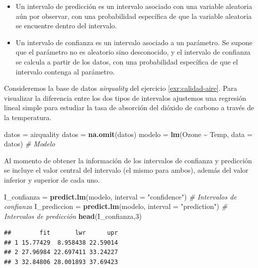 \documentclass[
  11pt,
]{book}
\newenvironment{Shaded}{\begin{snugshade}}{\end{snugshade}}
\newcommand{\AttributeTok}[1]{\textcolor[rgb]{0.13,0.29,0.53}{#1}}
\newcommand{\CommentTok}[1]{\textcolor[rgb]{0.56,0.35,0.01}{\textit{#1}}}
\newcommand{\DecValTok}[1]{\textcolor[rgb]{0.00,0.00,0.81}{#1}}
\newcommand{\FunctionTok}[1]{\textcolor[rgb]{0.13,0.29,0.53}{\textbf{#1}}}
\newcommand{\NormalTok}[1]{#1}
\newcommand{\OtherTok}[1]{\textcolor[rgb]{0.56,0.35,0.01}{#1}}
\newcommand{\SpecialCharTok}[1]{\textcolor[rgb]{0.81,0.36,0.00}{\textbf{#1}}}
\newcommand{\StringTok}[1]{\textcolor[rgb]{0.31,0.60,0.02}{#1}}
\theoremstyle{definition}
\theoremstyle{definition}
\theoremstyle{definition}
\theoremstyle{definition}
\theoremstyle{remark}
\begin{document}
\begin{itemize}
\item
  Un intervalo de predicción es un intervalo asociado con una variable aleatoria aún por observar, con una probabilidad específica de que la variable aleatoria se encuentre dentro del intervalo.
\item
  Un intervalo de confianza es un intervalo asociado a un parámetro. Se supone que el parámetro no es aleatorio sino desconocido, y el intervalo de confianza se calcula a partir de los datos, con una probabilidad específica de que el intervalo contenga al parámetro.
\end{itemize}

Consideremos la base de datos \emph{airquality} del ejercicio \ref{exr:calidad-aire}. Para visualizar la diferencia entre los dos tipos de intervalos ajustemos una regresión lineal simple para estudiar la tasa de absorción del dióxido de carbono a través de la temperatura.

\begin{Shaded}
\begin{Highlighting}[]
\NormalTok{datos }\OtherTok{=}\NormalTok{ airquality}
\NormalTok{datos }\OtherTok{=} \FunctionTok{na.omit}\NormalTok{(datos)}
\NormalTok{modelo }\OtherTok{=} \FunctionTok{lm}\NormalTok{(Ozone }\SpecialCharTok{\textasciitilde{}}\NormalTok{ Temp, }\AttributeTok{data =}\NormalTok{ datos) }\CommentTok{\# Modelo}
\end{Highlighting}
\end{Shaded}

Al momento de obtener la información de los intervalos de confianza y predicción se incluye el valor central del intervalo (el mismo para ambos), además del valor inferior y superior de cada uno.

\begin{Shaded}
\begin{Highlighting}[]
\NormalTok{I\_confianza }\OtherTok{=} \FunctionTok{predict.lm}\NormalTok{(modelo, }\AttributeTok{interval =} \StringTok{"confidence"}\NormalTok{) }\CommentTok{\# Intervalos de confianza}
\NormalTok{I\_prediccion }\OtherTok{=} \FunctionTok{predict.lm}\NormalTok{(modelo, }\AttributeTok{interval =} \StringTok{"prediction"}\NormalTok{) }\CommentTok{\# Intervalos de predicción}
\FunctionTok{head}\NormalTok{(I\_confianza,}\DecValTok{3}\NormalTok{)}
\end{Highlighting}
\end{Shaded}

\begin{verbatim}
##        fit       lwr      upr
## 1 15.77429  8.958438 22.59014
## 2 27.96984 22.697411 33.24227
## 3 32.84806 28.001893 37.69423
\end{verbatim}
\end{document}
